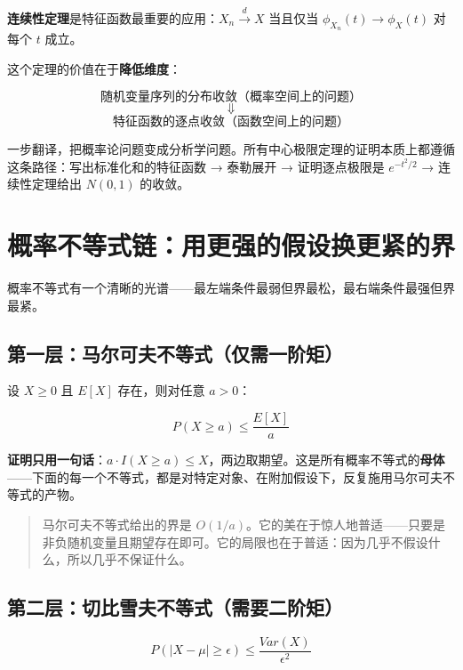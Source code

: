 \documentclass[
]{book}
\begin{document}
\textbf{连续性定理}是特征函数最重要的应用：\(X_n \xrightarrow{d} X\) 当且仅当 \(\phi_{X_n}(t) \to \phi_X(t)\) 对每个 \(t\) 成立。

这个定理的价值在于\textbf{降低维度}：

\[\text{随机变量序列的分布收敛（概率空间上的问题）}\]
\[\Downarrow\]
\[\text{特征函数的逐点收敛（函数空间上的问题）}\]

一步翻译，把概率论问题变成分析学问题。所有中心极限定理的证明本质上都遵循这条路径：写出标准化和的特征函数 → 泰勒展开 → 证明逐点极限是 \(e^{-t^2/2}\) → 连续性定理给出 \(N(0,1)\) 的收敛。

\section{概率不等式链：用更强的假设换更紧的界}\label{ux6982ux7387ux4e0dux7b49ux5f0fux94feux7528ux66f4ux5f3aux7684ux5047ux8bbeux6362ux66f4ux7d27ux7684ux754c}

概率不等式有一个清晰的光谱------最左端条件最弱但界最松，最右端条件最强但界最紧。

\subsection{第一层：马尔可夫不等式（仅需一阶矩）}\label{ux7b2cux4e00ux5c42ux9a6cux5c14ux53efux592bux4e0dux7b49ux5f0fux4ec5ux9700ux4e00ux9636ux77e9}

设 \(X \geq 0\) 且 \(E[X]\) 存在，则对任意 \(a > 0\)：

\[P(X \geq a) \leq \frac{E[X]}{a}\]

\textbf{证明只用一句话}：\(a \cdot I(X \geq a) \leq X\)，两边取期望。这是所有概率不等式的\textbf{母体}------下面的每一个不等式，都是对特定对象、在附加假设下，反复施用马尔可夫不等式的产物。

\begin{quote}
马尔可夫不等式给出的界是 \(O(1/a)\)。它的美在于惊人地普适------只要是非负随机变量且期望存在即可。它的局限也在于普适：因为几乎不假设什么，所以几乎不保证什么。
\end{quote}

\subsection{第二层：切比雪夫不等式（需要二阶矩）}\label{ux7b2cux4e8cux5c42ux5207ux6bd4ux96eaux592bux4e0dux7b49ux5f0fux9700ux8981ux4e8cux9636ux77e9}

\[P(|X - \mu| \geq \epsilon) \leq \frac{Var(X)}{\epsilon^2}\]
\end{document}
